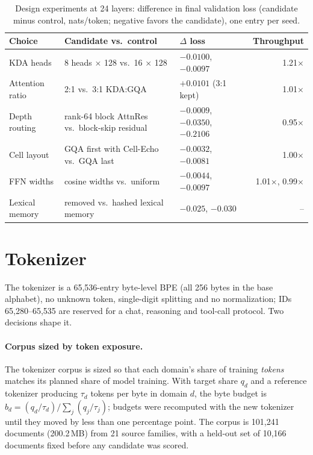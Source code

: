 \documentclass[11pt]{article}
\begin{document}
\begin{table}[t]
\centering\footnotesize\setlength{\tabcolsep}{4pt}
\caption{Design experiments at 24 layers: difference in final validation loss (candidate minus control,
nats/token; negative favors the candidate), one entry per seed.}\label{tab:arch-exp}
\begin{tabular}{@{}lllr@{}}
\toprule
Choice & Candidate vs.\ control & $\Delta$ loss & Throughput \\
\midrule
KDA heads & 8 heads $\times$ 128 vs.\ 16 $\times$ 128 & $-0.0100$, $-0.0097$ & 1.21$\times$ \\
Attention ratio & 2:1 vs.\ 3:1 KDA:GQA & $+0.0101$ (3:1 kept) & 1.01$\times$ \\
Depth routing & rank-64 block AttnRes vs.\ block-skip residual & $-0.0009$, $-0.0350$, $-0.2106$ & 0.95$\times$ \\
Cell layout & GQA first with Cell-Echo vs.\ GQA last & $-0.0032$, $-0.0081$ & 1.00$\times$ \\
FFN widths & cosine widths vs.\ uniform & $-0.0044$, $-0.0097$ & 1.01$\times$, 0.99$\times$ \\
Lexical memory & removed vs.\ hashed lexical memory & $-0.025$, $-0.030$ & -- \\
\bottomrule
\end{tabular}
\end{table}

\section{Tokenizer}\label{sec:tok}

The tokenizer is a 65,536-entry byte-level BPE (all 256 bytes in the base alphabet), no unknown token, single-digit splitting and
no normalization; IDs 65,280--65,535 are reserved for a chat, reasoning and tool-call protocol. Two decisions
shape it.

\paragraph{Corpus sized by token exposure.} The tokenizer corpus is sized so that each domain's share of
training \emph{tokens} matches its planned share of model training. With target share $q_d$ and a reference
tokenizer producing $\tau_d$ tokens per byte in domain $d$, the byte budget is
$b_d=(q_d/\tau_d)/\sum_j(q_j/\tau_j)$; budgets were recomputed with the new tokenizer until they moved by less
than one percentage point. The corpus is 101,241 documents (200.2\,MB) from 21 source families, with a held-out
set of 10,166 documents fixed before any candidate was scored.
\end{document}
